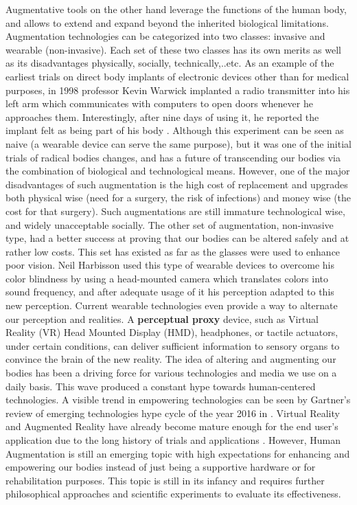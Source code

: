 Augmentative tools on the other hand leverage the functions of the human body, and allows to extend and expand beyond the inherited biological limitations. Augmentation technologies can be categorized into two classes: invasive and wearable (non-invasive). Each set of these two classes has its own merits as well as its disadvantages physically, socially, technically,..etc. As an example of the earliest trials on direct body implants of electronic devices other than for medical purposes, in 1998 professor Kevin Warwick implanted a radio transmitter into his left arm which communicates with computers to open doors whenever he approaches them. Interestingly, after nine days of using it, he reported the implant felt as being part of his body \cite{warwick2000cyborg}. Although this experiment can be seen as naive (a wearable device can serve the same purpose), but it was one of the initial trials of radical bodies changes, and has a future of transcending our bodies via the combination of biological and technological means. However, one of the major disadvantages of such augmentation is the high cost of replacement and upgrades both physical wise (need for a surgery, the risk of infections) and money wise (the cost for that surgery). Such augmentations are still immature technological wise, and widely unacceptable socially. The other set of augmentation, non-invasive type, had a better success at proving that our bodies can be altered safely and at rather low costs. This set has existed as far as the glasses were used to enhance poor vision. Neil Harbisson \cite{harbisson2012listen} used this type of wearable devices to overcome his color blindness by using a head-mounted camera which translates colors into sound frequency, and after adequate usage of it his perception adapted to this new perception. Current wearable technologies even provide a way to alternate our perception and realities. A \textbf{perceptual proxy} device, such as Virtual Reality (VR) Head Mounted Display (HMD), headphones, or tactile actuators, under certain conditions, can deliver sufficient information to sensory organs to convince the brain of the new reality. The idea of altering and augmenting our bodies has been a driving force for various technologies and media we use on a daily basis. This wave produced a constant hype towards human-centered technologies. A visible trend in empowering technologies can be seen by Gartner's review of emerging technologies hype cycle of the year 2016 \cite{hype2016gartner} in . Virtual Reality and Augmented Reality have already become mature enough for the end user's application due to the long history of trials and applications \cite{rheingold1991virtual}. However, Human Augmentation is still an emerging topic with high expectations for enhancing and empowering our bodies instead of just being a supportive hardware or for rehabilitation purposes. This topic is still in its infancy and requires further philosophical approaches and scientific experiments to evaluate its effectiveness. 

